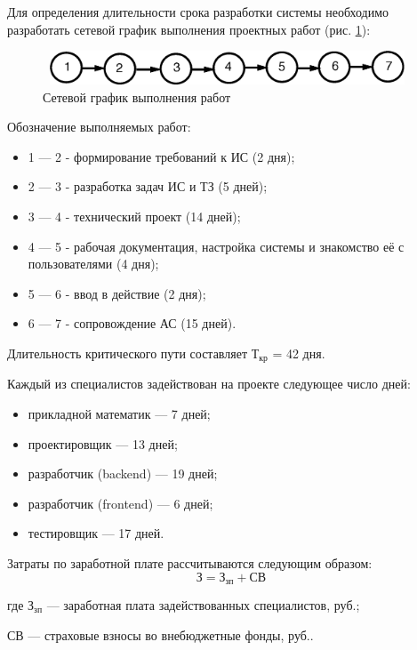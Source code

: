 			\newpage
			Для определения длительности срока разработки системы необходимо разработать сетевой график выполнения проектных работ (рис. \ref{img:network_diagram}):

			\begin{figure}[h!]
				\center
				\includegraphics[width=11cm, height=1cm]{images/network_diagram.eps}
				\caption{Сетевой график выполнения работ\label{img:network_diagram}}
			\end{figure}

			Обозначение выполняемых работ:
			\begin{itemize}
				\item 1 --- 2 - формирование требований к ИС (2 дня);
				\item 2 --- 3 - разработка задач ИС и ТЗ (5 дней);
				\item 3 --- 4 - технический проект (14 дней);
				\item 4 --- 5 - рабочая документация, настройка системы и знакомство её с пользователями (4 дня);
				\item 5 --- 6 - ввод в действие (2 дня);
				\item 6 --- 7 - сопровождение АС (15 дней).
			\end{itemize}

			Длительность критического пути составляет $\text{Т}_{\text{кр}}$  = 42 дня.

			\indent Каждый из специалистов задействован на проекте следующее число дней:
			\begin{itemize}
				\item прикладной математик --- 7 дней;
				\item проектировщик --- 13 дней;
				\item разработчик (backend) --- 19 дней;
				\item разработчик (frontend) --- 6 дней;
				\item тестировщик --- 17 дней.
			\end{itemize}

			Затраты по заработной плате рассчитываются следующим образом:
			\begin{equation}\label{eq:salary}
				\text{З} = \text{З}_{\text{зп}} + \text{СВ}
			\end{equation}
				\begin{ESKDexplanation}
				\item[где ]$\text{З}_{\text{зп}}$ --- заработная плата задействованных специалистов, руб.;
				\item $\text{СВ}$ --- страховые взносы во внебюджетные фонды, руб..
			\end{ESKDexplanation}

